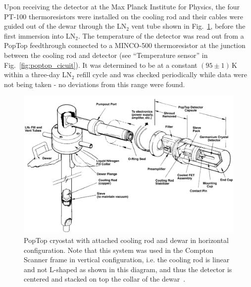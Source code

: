 Upon receiving the detector at the Max Planck Institute for Physics, the four PT-100 thermoresistors were installed on the cooling rod and their cables were guided out of the dewar through the LN$_2$ vent tube shown in Fig.~\ref{fig:poptop}, before the first immersion into LN$_2$. The temperature of the detector was read out from a PopTop feedthrough connected to a MINCO-500 thermoresistor at the junction between the cooling rod and detector (see ``Temperature sensor'' in Fig.~\ref{fig:poptop_cicuit}). It was determined to be at a constant $(95 \pm 1)$\,K within a three-day LN$_2$ refill cycle and was checked periodically while data were not being taken - no deviations from this range were found.
\begin{figure}[htb]
    \centering
    \includegraphics[width=6in]{figs/integration/poptop_labeled.png}
    \caption{PopTop cryostat with attached cooling rod and dewar in horizontal configuration. Note that this system was used in the Compton Scanner frame in vertical configuration, i.e. the cooling rod is linear and not L-shaped as shown in this diagram, and thus the detector is centered and stacked on top the collar of the dewar~\cite{poptopmanual}.}
    \label{fig:poptop}
\end{figure}

